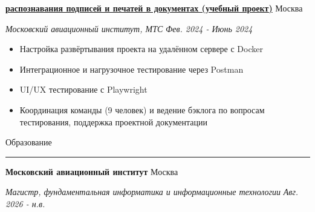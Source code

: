 \documentclass[14pt, a4paper, oneside]{extarticle}
\begin{document}

\begin{flushleft}
	\vspace{-0.8\intextsep}
	\quad
	\href{https://github.com/Crazy5202/CM_2024}{\textbf{ распознавания подписей и печатей в документах (учебный проект)}}
	\hfill
	Москва
\end{flushleft}

\begin{flushleft}
	\vspace{-1\intextsep}
	\quad
	\textit{Московский авиационный институт, МТС}
	\hfill
	\textit{\small Фев. 2024 - Июнь 2024}
\end{flushleft}


\begin{itemize}
    \vspace{-2\intextsep}
    \item Настройка развёртывания проекта на удалённом сервере с Docker
	\vspace{-0.8\intextsep}
	\item Интеграционное и нагрузочное тестирование через Postman
	\vspace{-0.8\intextsep}
	\item UI/UX тестирование с Playwright
	\vspace{-0.8\intextsep}
    \item Координация команды (9 человек) и ведение бэклога по вопросам тестирования, поддержка проектной
    документации
\end{itemize}


\begin{flushleft}
	\vspace{-\intextsep}
	\large Образование
\end{flushleft}

\vspace{-0.8\intextsep}
\hrule


\begin{flushleft}
	\vspace{-0.8\intextsep}
	\quad
	\textbf{Московский авиационный институт}
	\hfill
	Москва
\end{flushleft}

\begin{flushleft}
	\vspace{-\intextsep}
	\quad
	\textit{\footnotesize Магистр, фундаментальная информатика и информационные технологии} 
	\hfill
	\textit{\small Авг. 2026 - н.в.}
\end{flushleft}
\end{document}
